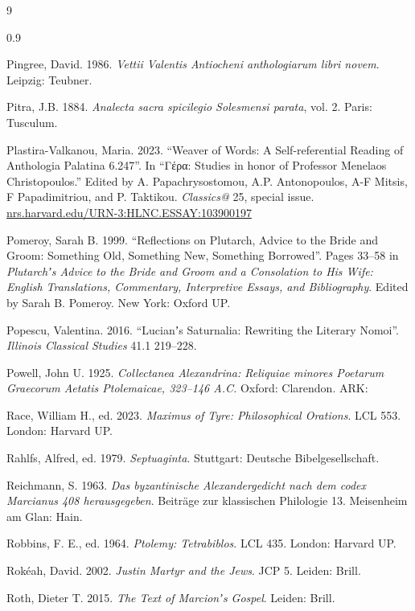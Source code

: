 \begin{thebibliography}{9}
\begin{spacing}{0.9}
\begin{small}
Pingree, David. 1986. %
\textit{Vettii Valentis Antiocheni anthologiarum libri novem}. %
Leipzig: Teubner. %

Pitra, J.B. 1884. %
\textit{Analecta sacra spicilegio Solesmensi parata}, vol. 2. %
Paris: Tusculum.

Plastira-Valkanou, Maria. 2023. %
“Weaver of Words: A Self-referential Reading of Anthologia Palatina 6.247”. %
In “Γέρα: Studies in honor of Professor Menelaos Christopoulos.” %
Edited by A. Papachrysostomou, A.P. Antonopoulos, A-F Mitsis, F Papadimitriou, and P. Taktikou. %
\textit{Classics@} 25, special issue. %
\url{nrs.harvard.edu/URN-3:HLNC.ESSAY:103900197}

Pomeroy, Sarah B. 1999. %
“Reflections on Plutarch, Advice to the Bride and Groom: %
Something Old, Something New, Something Borrowed”. %
Pages 33--58 in %
\textit{Plutarchʼs Advice to the Bride and Groom and a Consolation to His Wife: %
English Translations, Commentary, Interpretive Essays, and Bibliography}. %
Edited by Sarah B. Pomeroy. %
New York: Oxford UP. %

Popescu, Valentina. 2016. %
“Lucianʼs Saturnalia: Rewriting the Literary Nomoi”. %
\textit{Illinois Classical Studies} 41.1 219--228. %

Powell, John U. 1925. %
\textit{Collectanea Alexandrina: Reliquiae minores Poetarum Graecorum Aetatis Ptolemaicae, 323--146 A.C.} %
Oxford: Clarendon. %
ARK: 

Race, William H., ed. 2023. %
\textit{Maximus of Tyre: Philosophical Orations}. %
LCL 553. %
London: Harvard UP. %

Rahlfs, Alfred, ed. 1979. \textit{Septuaginta}. %
Stuttgart: Deutsche Bibelgesellschaft. %

Reichmann, S. 1963. %
\textit{Das byzantinische Alexandergedicht nach dem codex Marcianus 408 herausgegeben}. %
Beiträge zur klassischen Philologie 13. %
Meisenheim am Glan: Hain. %

Robbins, F. E., ed. 1964. %
\textit{Ptolemy: Tetrabiblos}. %
LCL 435. London: Harvard UP. %

Rokéah, David. 2002. %
\textit{Justin Martyr and the Jews}. %
JCP 5. Leiden: Brill. %

Roth, Dieter T. 2015. %
\textit{The Text of Marcionʼs Gospel}. %
Leiden: Brill. %


\end{small}
\end{spacing}
\end{thebibliography}
